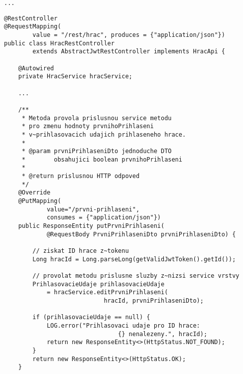\documentclass[twoside, 12pt]{article}
\begin{document}
{{\begin{lstlisting}
...
\end{lstlisting}

\clearpage


\begin{lstlisting}
@RestController
@RequestMapping(
        value = "/rest/hrac", produces = {"application/json"})
public class HracRestController
        extends AbstractJwtRestController implements HracApi {

    @Autowired
    private HracService hracService;

    ...

    /**
     * Metoda provola prislusnou service metodu
     * pro zmenu hodnoty prvnihoPrihlaseni
     * v~prihlasovacich udajich prihlaseneho hrace.
     *
     * @param prvniPrihlaseniDto jednoduche DTO
     *        obsahujici boolean prvnihoPrihlaseni
     *
     * @return prislusnou HTTP odpoved
     */
    @Override
    @PutMapping(
            value="/prvni-prihlaseni",
            consumes = {"application/json"})
    public ResponseEntity putPrvniPrihlaseni(
            @RequestBody PrvniPrihlaseniDto prvniPrihlaseniDto) {

        // ziskat ID hrace z~tokenu
        Long hracId = Long.parseLong(getValidJwtToken().getId());

        // provolat metodu prislusne sluzby z~nizsi service vrstvy
        PrihlasovacieUdaje prihlasovacieUdaje
            = hracService.editPrvniPrihlaseni(
                            hracId, prvniPrihlaseniDto);

        if (prihlasovacieUdaje == null) {
            LOG.error("Prihlasovaci udaje pro ID hrace:
                                {} nenalezeny.", hracId);
            return new ResponseEntity<>(HttpStatus.NOT_FOUND);
        }
        return new ResponseEntity<>(HttpStatus.OK);
    }
\end{lstlisting}

\clearpage


\vspace{10}



\vspace{10}


}}
\end{document}
